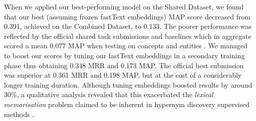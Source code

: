 When we applied our best-performing model on the Shared Dataset, we found that our best (assuming frozen fastText embeddings) MAP score decreased from 0.391, achieved on the Combined Dataset, to 0.133.  The poorer performance was reflected by the official shared task submissions and baselines which in aggregate scored a mean 0.077 MAP when testing on concepts and entities \citep{camacho2018semeval}.  We managed to boost our scores by tuning our fastText embeddings in a secondary training phase thus obtaining 0.348 MRR and 0.173 MAP.  The official best submission was superior at 0.361 MRR and 0.198 MAP, but at the cost of a considerably longer training duration.  Although tuning embeddings boosted results by around 30\%, a qualitative analysis revealed that this exacerbated the \textit{lexical memorisation} problem claimed to be inherent in hypernym discovery supervised methods \citep{levy2015supervised}.


